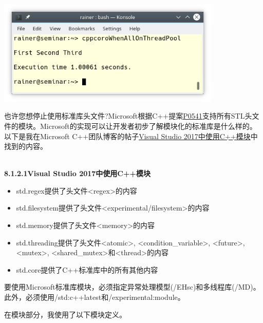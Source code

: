 \begin{center}
\includegraphics[width=0.8\textwidth]{content/5/chapter8/images/6.png}\\
\end{center}


也许您想停止使用标准库头文件?Microsoft根据C++提案\href{http://www.open-std.org/JTC1/SC22/WG21/docs/papers/2017/p0581r0.pdf}{P0541}支持所有STL头文件的模块。Microsoft的实现可以让开发者初步了解模块化的标准库是什么样的。以下是我在Microsoft C++团队博客的帖子\href{https://devblogs.microsoft.com/cppblog/cpp-modules-in-visual-studio-2017/}{Visual Studio 2017中使用C++模块}中找到的内容。

\hspace*{\fill} \\ %
\noindent
\textbf{8.1.2.1\hspace{0.2cm}Visual Studio 2017中使用C++模块}

\begin{itemize}
\item 
std.regex提供了头文件<regex>的内容

\item 
std.filesystem提供了头文件<experimental/filesystem>的内容

\item 
std.memory提供了头文件<memory>的内容

\item 
std.threading提供了头文件<atomic>, <condition\_variable>, <future>, <mutex>, <shared\_mutex>和<thread>的内容

\item 
std.core提供了C++标准库中的所有其他内容
\end{itemize}

要使用Microsoft标准库模块，必须指定异常处理模型(/EHsc)和多线程库(/MD)。此外，必须使用/std:c++latest和/experimental:module。

在模块部分，我使用了以下模块定义。

